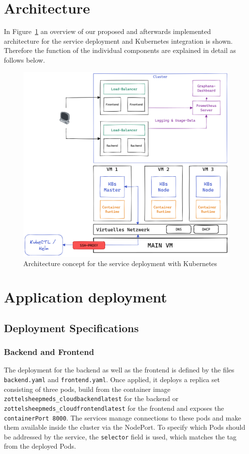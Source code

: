 \section{Architecture}
    In Figure~\ref{fig:Architecture} an overview of our proposed and afterwards implemented architecture for the service deployment and Kubernetes integration is shown. Therefore the function of the individual components are explained in detail as follows below.
    
    \begin{figure}[htbp]
        \includegraphics[width=15cm]{assets/architecture-overview.png}
        \centering
        \captionsetup{justification=centering, margin=1cm}
        \caption{Architecture concept for the service deployment with Kubernetes}
        \label{fig:Architecture}
    \end{figure}
\section{Application deployment}
    \subsection{Deployment Specifications}
        \subsubsection{Backend and Frontend}
            The deployment for the backend as well as the frontend is defined by the files \texttt{backend.yaml} and \texttt{frontend.yaml}.
            Once applied, it deploys a replica set consisting of three pods, build from the container image \texttt{zottelsheep\/meds\_cloud\:backend\-latest} for the backend
            or \texttt{zottelsheep\/meds\_cloud\:frontend\-latest} for the frontend and exposes the \texttt{containerPort 8000}.
            The services manage connections to these pods and make them available inside the cluster via the NodePort. 
            To specify which Pods should be addressed by the service, the \texttt{selector} field is used, which matches the tag from the deployed Pods.

